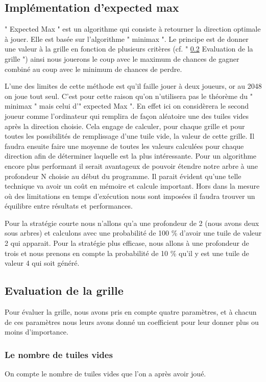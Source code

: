 \documentclass[12pt]{article}
\begin{document}
\subsection{Implémentation d'expected max}
" Expected Max " est un algorithme qui consiste à retourner la direction
optimale à jouer. Elle est basée sur l'algorithme " minimax ". Le
principe est de donner une valeur à la grille en fonction de plusieurs critères
(cf. " \ref{eval_grid} Evaluation de la grille ") ainsi nous jouerons le
coup avec le maximum de chances de gagner combiné au coup avec le minimum de
chances de perdre.
\par L'une des limites de cette méthode est qu'il faille jouer à deux
joueurs, or au 2048 on joue tout seul. C'est pour cette raison qu'on n'utilisera
pas le théorème du " minimax " mais celui d'" expected Max ". En effet
ici on considèrera le second joueur comme l'ordinateur qui remplira de façon
aléatoire une des tuiles vides après la direction choisie. Cela engage de
calculer, pour chaque grille et pour toutes les possibilités de remplissage
d'une tuile vide, la valeur de cette grille. Il faudra ensuite faire une moyenne
de toutes les valeurs calculées pour chaque direction afin de déterminer
laquelle est la plus intéressante. Pour un algorithme encore plus performant il serait
avantageux de pouvoir étendre notre arbre à une profondeur N choisie au
début du programme. Il parait évident qu'une telle technique va avoir un coût
en mémoire et calcule important. Hors dans la mesure où des limitations en temps
d'exécution nous sont imposées il faudra trouver un équilibre entre résultats et
performances.
\par Pour la stratégie courte nous n'allons qu'a une profondeur de 2 (nous
avons deux sous arbres) et calculons avec une probabilité de 100 \%
d'avoir une tuile de valeur 2 qui apparait. Pour la stratégie plus
efficase, nous allons à une profondeur de trois et nous prenons en compte
la probabilité de 10 \% qu'il y est une tuile de valeur 4 qui soit
généré.

\subsection{Evaluation de la grille}
\label{eval_grid}
Pour évaluer la grille, nous avons pris en compte quatre paramètres, et à chacun
de ces paramètres nous leurs avons donné un coefficient pour leur donner plus ou
moins d'importance. \cite{Eval}

\subsubsection{Le nombre de tuiles vides}
On compte le nombre de tuiles vides que l'on a après avoir joué.
\end{document}
